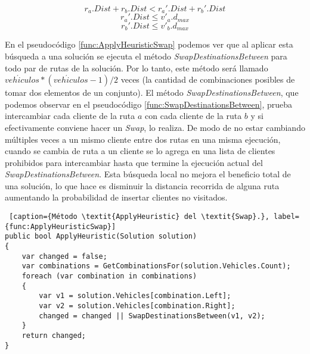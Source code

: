 \begin{equation}\label{eq:swap1}
r_a.Dist + r_b.Dist < r_a'.Dist + r_b'.Dist
\end{equation} 
\begin{equation}\label{eq:swap2}
r_a'.Dist \leq v'_a.d_{max}
\end{equation} 
\begin{equation}\label{eq:swap3}
r_b'.Dist \leq v'_b.d_{max}
\end{equation} 

\bigskip

En el pseudocódigo \ref{func:ApplyHeuristicSwap} podemos ver que al aplicar esta búsqueda a una solución se ejecuta el método \textit{SwapDestinationsBetween} para todo par de rutas de la solución. Por lo tanto, este método será llamado $veh\acute{i}culos * (veh\acute{i}culos-1) / 2$ veces (la cantidad de combinaciones posibles de tomar dos elementos de un conjunto). El método \textit{SwapDestinationsBetween}, que podemos observar en el pseudocódigo \ref{func:SwapDestinationsBetween}, prueba intercambiar cada cliente de la ruta $a$ con cada cliente de la ruta $b$ y si efectivamente conviene hacer un \textit{Swap}, lo realiza. De modo de no estar cambiando múltiples veces a un mismo cliente entre dos rutas en una misma ejecución, cuando se cambia de ruta a un cliente se lo agrega en una lista de clientes prohibidos para intercambiar hasta que termine la ejecución actual del \textit{SwapDestinationsBetween}. Esta búsqueda local no mejora el beneficio total de una solución, lo que hace es disminuir la distancia recorrida de alguna ruta aumentando la probabilidad de insertar clientes no visitados.

\bigskip

\begin{minipage}{\textwidth}
\begin{lstlisting} [caption={Método \textit{ApplyHeuristic} del \textit{Swap}.}, label={func:ApplyHeuristicSwap}]
public bool ApplyHeuristic(Solution solution)
{
	var changed = false;
	var combinations = GetCombinationsFor(solution.Vehicles.Count);
	foreach (var combination in combinations)
	{
		var v1 = solution.Vehicles[combination.Left];
		var v2 = solution.Vehicles[combination.Right];
		changed = changed || SwapDestinationsBetween(v1, v2);
	}
	return changed;
}
\end{lstlisting}
\end{minipage}

